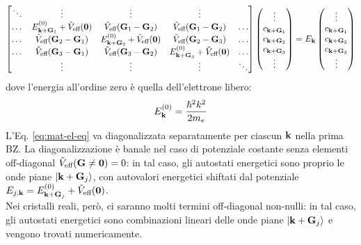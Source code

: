 \begin{equation}
	\begin{bmatrix}
		\ddots & \vdots & \vdots & \vdots &  \\
		\dots & E_{\mathbf{k} + \mathbf{G}_1}^{(0)} + \tilde{V}_\text{eff}(\mathbf{0}) & \tilde{V}_\text{eff}(\mathbf{G}_1 - \mathbf{G}_2) & \tilde{V}_\text{eff}(\mathbf{G}_1 - \mathbf{G}_2) & \dots \\
		\dots & \tilde{V}_\text{eff}(\mathbf{G}_2 - \mathbf{G}_1) & E_{\mathbf{k} + \mathbf{G}_2}^{(0)} + \tilde{V}_\text{eff}(\mathbf{0}) & \tilde{V}_\text{eff}(\mathbf{G}_2 - \mathbf{G}_3) & \dots \\
		\dots & \tilde{V}_\text{eff}(\mathbf{G}_3 - \mathbf{G}_1) & \tilde{V}_\text{eff}(\mathbf{G}_3 - \mathbf{G}_2) & E_{\mathbf{k} + \mathbf{G}_3}^{(0)} + \tilde{V}_\text{eff}(\mathbf{0}) & \dots \\
		 & \vdots & \vdots & \vdots & \ddots
	\end{bmatrix}
	\begin{pmatrix}
		\vdots \\ c_{\mathbf{k} + \mathbf{G}_1} \\ c_{\mathbf{k} + \mathbf{G}_2} \\ c_{\mathbf{k} + \mathbf{G}_3} \\ \vdots
	\end{pmatrix}
	= E_{\mathbf{k}}
	\begin{pmatrix}
		\vdots \\ c_{\mathbf{k} + \mathbf{G}_1} \\ c_{\mathbf{k} + \mathbf{G}_2} \\ c_{\mathbf{k} + \mathbf{G}_3} \\ \vdots
	\end{pmatrix}
	\label{eq:mat-el-eq}
\end{equation}
dove l'energia all'ordine zero è quella dell'elettrone libero:
\begin{equation}
	E_{\mathbf{k}}^{(0)} = \frac{\hbar^2 k^2}{2m_e}
\end{equation}
L'Eq. \ref{eq:mat-el-eq} va diagonalizzata separatamente per ciascun $ \mathbf{k} $ nella prima BZ. La diagonalizzazione è banale nel caso di potenziale costante senza elementi off-diagonal $ \tilde{V}_\text{eff}(\mathbf{G} \neq \mathbf{0}) = 0 $: in tal caso, gli autostati energetici sono proprio le onde piane $ \ket{\mathbf{k} + \mathbf{G}_j} $, con autovalori energetici shiftati dal potenziale $ E_{j,\mathbf{k}} = E_{\mathbf{k} + \mathbf{G}_j}^{(0)} + \tilde{V}_\text{eff}(\mathbf{0}) $. \\
Nei cristalli reali, però, ci saranno molti termini off-diagonal non-nulli: in tal caso, gli autostati energetici sono combinazioni lineari delle onde piane $ \ket{\mathbf{k} + \mathbf{G}_j} $ e vengono trovati numericamente. \\

